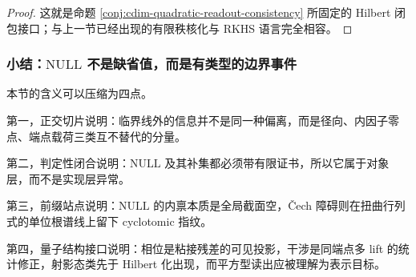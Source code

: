 \begin{proof}
这就是命题 \ref{conj:cdim-quadratic-readout-consistency} 所固定的 Hilbert 闭包接口；与上一节已经出现的有限秩核化与 RKHS 语言完全相容。
\end{proof}

\subsubsection{小结：\texorpdfstring{$\mathrm{NULL}$}{NULL} 不是缺省值，而是有类型的边界事件}\label{subsubsec:typed-address-biaxial-completion-orthogonal-summary}
本节的含义可以压缩为四点。

第一，正交切片说明：临界线外的信息并不是同一种偏离，而是径向、内因子零点、端点载荷三类互不替代的分量。

第二，判定性闭合说明：\(\mathrm{NULL}\) 及其补集都必须带有限证书，所以它属于对象层，而不是实现层异常。

第三，前缀站点说明：\(\mathrm{NULL}\) 的内禀本质是全局截面空，Čech 障碍则在扭曲行列式的单位根谱线上留下 cyclotomic 指纹。

第四，量子结构接口说明：相位是粘接残差的可见投影，干涉是同端点多 lift 的统计修正，射影态类先于 Hilbert 化出现，而平方型读出应被理解为表示目标。
